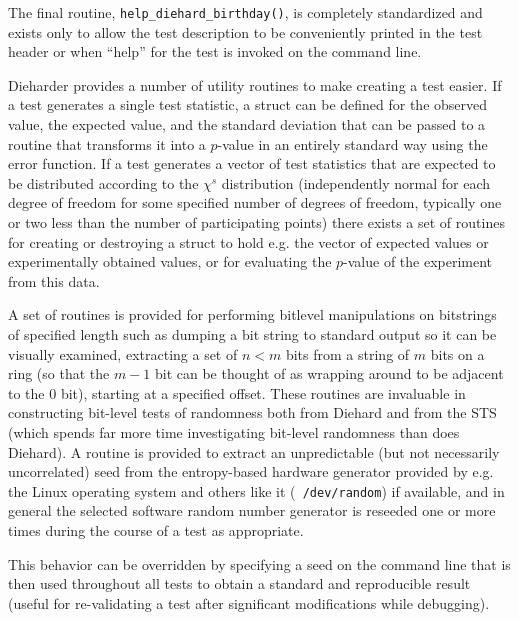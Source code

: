 \documentclass[12pt]{article}
\begin{document}
The final routine, {\tt help\_diehard\_birthday()}, is completely
standardized and exists only to allow the test description to be
conveniently printed in the test header or when ``help'' for the test is
invoked on the command line.

Dieharder provides a number of utility routines to make creating a test
easier.  If a test generates a single test statistic, a struct can be
defined for the observed value, the expected value, and the standard
deviation that can be passed to a routine that transforms it into a
$p$-value in an entirely standard way using the error function.  If a
test generates a vector of test statistics that are expected to be
distributed according to the $\chi^s$ distribution (independently normal
for each degree of freedom for some specified number of degrees of
freedom, typically one or two less than the number of participating
points) there exists a set of routines for creating or destroying a
struct to hold e.g. the vector of expected values or experimentally
obtained values, or for evaluating the $p$-value of the experiment from
this data.

A set of routines is provided for performing bitlevel manipulations on
bitstrings of specified length such as dumping a bit string to standard
output so it can be visually examined, extracting a set of $n<m$ bits
from a string of $m$ bits on a ring (so that the $m-1$ bit can be
thought of as wrapping around to be adjacent to the $0$ bit), starting
at a specified offset.  These routines are invaluable in constructing
bit-level tests of randomness both from Diehard and from the STS (which
spends far more time investigating bit-level randomness than does
Diehard).  A routine is provided to extract an unpredictable (but not
necessarily uncorrelated) seed from the entropy-based hardware generator
provided by e.g. the Linux operating system and others like it ({\tt
/dev/random}) if available, and in general the selected software random
number generator is reseeded one or more times during the course of a
test as appropriate.  

This behavior can be overridden by specifying a seed on the command line
that is then used throughout all tests to obtain a standard and
reproducible result (useful for re-validating a test after significant
modifications while debugging).  
\end{document}
